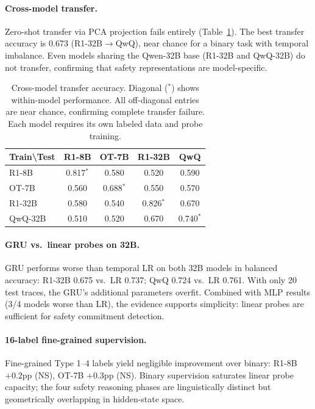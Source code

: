 \documentclass[11pt,a4paper]{article}
\newcommand{\pp}{\text{pp}}
\begin{document}
\paragraph{Cross-model transfer.}
Zero-shot transfer via PCA projection fails entirely (Table~\ref{tab:transfer}).
The best transfer accuracy is 0.673 (R1-32B$\to$QwQ), near chance for a binary task with temporal imbalance.
Even models sharing the Qwen-32B base (R1-32B and QwQ-32B) do not transfer, confirming that safety representations are model-specific.

\begin{table}[t]
\centering
\small
\begin{tabular}{lcccc}
\toprule
\textbf{Train\textbackslash Test} & \textbf{R1-8B} & \textbf{OT-7B} & \textbf{R1-32B} & \textbf{QwQ} \\
\midrule
R1-8B & 0.817$^*$ & 0.580 & 0.520 & 0.590 \\
OT-7B & 0.560 & 0.688$^*$ & 0.550 & 0.570 \\
R1-32B & 0.580 & 0.540 & 0.826$^*$ & 0.670 \\
QwQ-32B & 0.510 & 0.520 & 0.670 & 0.740$^*$ \\
\bottomrule
\end{tabular}
\caption{Cross-model transfer accuracy. Diagonal ($^*$) shows within-model performance. All off-diagonal entries are near chance, confirming complete transfer failure. Each model requires its own labeled data and probe training.}
\label{tab:transfer}
\end{table}

\paragraph{GRU vs.\ linear probes on 32B.}
GRU performs worse than temporal LR on both 32B models in balanced accuracy: R1-32B 0.675 vs.\ LR 0.737; QwQ 0.724 vs.\ LR 0.761.
With only 20 test traces, the GRU's additional parameters overfit.
Combined with MLP results (3/4 models worse than LR), the evidence supports simplicity: linear probes are sufficient for safety commitment detection.

\paragraph{16-label fine-grained supervision.}
Fine-grained Type 1--4 labels yield negligible improvement over binary: R1-8B $+0.2\pp$ (NS), OT-7B $+0.3\pp$ (NS).
Binary supervision saturates linear probe capacity; the four safety reasoning phases are linguistically distinct but geometrically overlapping in hidden-state space.
\end{document}
